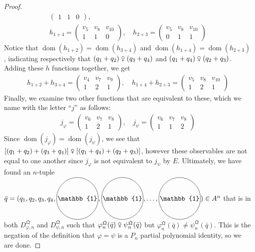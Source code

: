 \documentclass{scrartcl}
\DeclareMathOperator{\dom}{dom}
\renewcommand{\phi}{\varphi}
\newcommand{\FQ}{\mathfrak{Q}}
\newcommand{\com}{\mathrel{\venus}}
\newcommand*\circled[1]{\tikz[baseline=(char.base)]{
  \node[shape=circle,draw,inner sep=1pt] (char) {#1};}}
\newcommand{\circone}{\circled{$\mathbb{1}$}}
\begin{document}
\begin{examples}
\begin{enumerate}[(1)]
\begin{proof}
\begin{align*}
\begin{pmatrix}
1 & 1 & 0
\end{pmatrix},\\
h_{1+4}=\begin{pmatrix}
v_5 & v_8 & v_{10}\\
1 & 1 & 0
\end{pmatrix},\quad h_{2+3}=\begin{pmatrix}
v_5 & v_8 & v_{10}\\
0 & 1 & 1
\end{pmatrix}
\end{align*}
Notice that $\dom(h_{1+2})=\dom(h_{3+4})$ and $\dom(h_{1+4})=\dom(h_{2+3})$, indicating respectively that $(q_1+q_2)\com(q_3+q_4)$ and $(q_1+q_4)\com(q_2+q_3)$. Adding these $h$ functions together, we get
\begin{align*}
h_{1+2}+h_{3+4}=\begin{pmatrix}
v_4 & v_7 & v_9\\
1 & 2 & 1
\end{pmatrix},\quad h_{1+4}+h_{2+3}=\begin{pmatrix}
v_5 & v_8 & v_{10}\\
1 & 2 & 1
\end{pmatrix}
\end{align*}
Finally, we examine two other functions that are equivalent to these, which we name with the letter ``$j$'' as follows:
\begin{align*}
j_{\phi}=\begin{pmatrix}
v_6 & v_7 & v_8\\
1 & 2 & 1
\end{pmatrix},\quad j_{\psi}=\begin{pmatrix}
v_6 & v_7 & v_8\\
1 & 1 & 2
\end{pmatrix}
\end{align*}
Since $\dom(j_{\phi})=\dom(j_{\psi})$, we see that $[(q_1+q_2)+(q_3+q_4)]\com[(q_1+q_4)+(q_2+q_3)]$, however these observables are not equal to one another since $j_{\phi}$ is not equivalent to $j_{\psi}$ by $E$. Ultimately, we have found an $n$-tuple $\bar{q}=(q_1,q_2,q_3,q_4,\circone,\circone,\ldots,\circone)\in A^n$ that is in both $D_{\phi,n}^{\FQ}$ and $D_{\psi,n}^{\FQ}$ such that $\phi_n^{\FQ}(\bar{q})\com\psi_n^{\FQ}(\bar{q})$ but $\phi_n^{\FQ}(\bar{q})\ne\psi_n^{\FQ}(\bar{q})$. This is the negation of the definition that $\phi=\psi$ is a $P_n$ partial polynomial identity, so we are done.
\end{proof}

\end{enumerate}
\end{examples}
\end{document}
